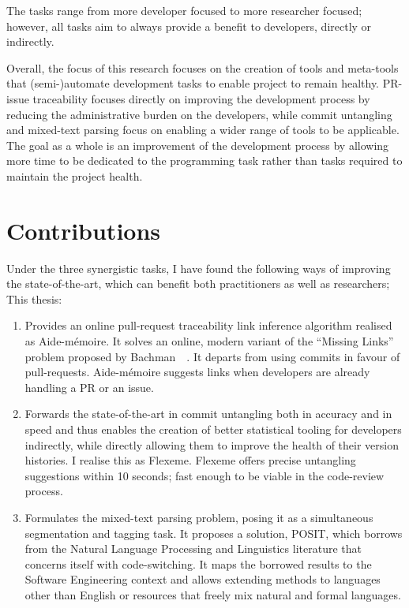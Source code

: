 \noindent The tasks range from more developer focused to more researcher
focused; however, all tasks aim to always provide a benefit to developers,
directly or indirectly.

Overall, the focus of this research focuses on the creation of tools and
meta-tools that (semi-)automate development tasks to enable project to remain
healthy. PR-issue traceability focuses directly on improving the development
process by reducing the administrative burden on the developers, while commit
untangling and mixed-text parsing focus on enabling a wider range of tools to be
applicable. The goal as a whole is an improvement of the development process by
allowing more time to be dedicated to the programming task rather than tasks
required to maintain the project health.

\section{Contributions}
\label{chapter:introduction:sec:contrib}

Under the three synergistic tasks, I have found the following ways of improving
the state-of-the-art, which can benefit both practitioners as well as
researchers; This thesis:

\begin{enumerate}
    \item Provides an online pull-request traceability link inference algorithm
    realised as Aide-mémoire. It solves an online, modern variant of the
    ``Missing Links'' problem proposed by Bachman~\etal~\cite{MissingLinks}. It
    departs from using commits in favour of pull-requests. Aide-mémoire suggests
    links when developers are already handling a PR or an issue.

    \item Forwards the state-of-the-art in commit untangling both in accuracy
    and in speed and thus enables the creation of better statistical tooling for
    developers indirectly, while directly allowing them to improve the health of
    their version histories. I realise this as Flexeme. Flexeme offers precise
    untangling suggestions within 10 seconds; fast enough to be viable in the
    code-review process.

    \item Formulates the mixed-text parsing problem, posing it as a simultaneous
    segmentation and tagging task. It proposes a solution, POSIT, which borrows
    from the Natural Language Processing and Linguistics literature that
    concerns itself with code-switching. It maps the borrowed results to the
    Software Engineering context and allows extending methods to languages other
    than English or resources that freely mix natural and formal languages.
\end{enumerate}

